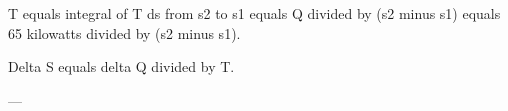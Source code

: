 T equals integral of T ds from s2 to s1 equals Q divided by (s2 minus s1) equals 65 kilowatts divided by (s2 minus s1).  

Delta S equals delta Q divided by T.  

---